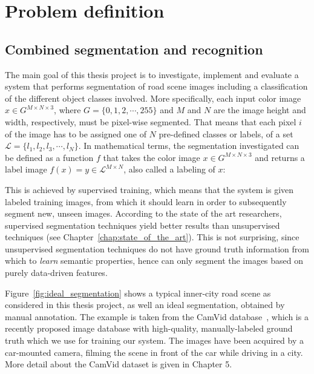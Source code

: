 \chapter{Problem definition} \label{chap:problem_definition}

\section{Combined segmentation and recognition} \label{sect:main_goal}

The main goal of this thesis project is to investigate, implement and evaluate a system that performs segmentation of road scene images including a classification of the different object classes involved. More specifically, each input color image $x \in G^{M\times N\times 3}$, where $G = \{ 0, 1, 2, \cdots, 255\}$ and $M$ and $N$ are the image height and width, respectively, must be pixel-wise segmented. That means that each pixel $i$ of the image has to be assigned one of $N$ pre-defined classes or labels, of a set $\mathcal L = \{ l_1, l_2, l_3, \cdots, l_N\}$. In mathematical terms, the segmentation investigated can be defined as a function $f$ that takes the color image $x \in G^{M\times N\times 3}$ and returns a label image $f(x) = y \in \mathcal L^{M\times N}$, also called a labeling of $x$:

This is achieved by supervised training, which means that the system is given labeled training images, from which it should learn in order to subsequently segment new, unseen images. According to the state of the art researchers, supervised segmentation techniques yield better results than unsupervised techniques (see Chapter~\ref{chap:state_of_the_art}). This is not surprising, since unsupervised segmentation techniques do not have ground truth information from which to \emph{learn} semantic properties, hence can only segment the images based on purely data-driven features.


Figure~\ref{fig:ideal_segmentation} shows a typical inner-city road scene as considered in this thesis project, as well an ideal segmentation, obtained by manual annotation. The example is taken from the CamVid database~\cite{brostow:camvid}, which is a recently proposed image database with high-quality, manually-labeled ground truth which we use for training our system. The images have been acquired by a car-mounted camera, filming the scene in front of the car while driving in a city. More detail about the CamVid dataset is given in Chapter 5.

